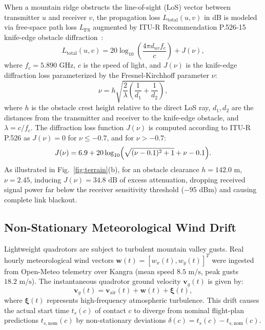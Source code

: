 \documentclass[preprint,12pt,5p,twocolumn]{elsarticle}
\begin{document}
When a mountain ridge obstructs the line-of-sight (LoS) vector between transmitter $u$ and receiver $v$, the propagation loss $L_{\text{total}}(u, v)$ in dB is modeled via free-space path loss $L_{\text{FS}}$ augmented by ITU-R Recommendation P.526-15 knife-edge obstacle diffraction~\cite{itur2019p526}:
\begin{equation}
L_{\text{total}}(u, v) = 20 \log_{10}\left(\frac{4\pi d_{uv} f_c}{c}\right) + J(\nu),
\end{equation}
where $f_c = 5.890\text{ GHz}$, $c$ is the speed of light, and $J(\nu)$ is the knife-edge diffraction loss parameterized by the Fresnel-Kirchhoff parameter $\nu$:
\begin{equation}
\nu = h \sqrt{\frac{2}{\lambda} \left(\frac{1}{d_1} + \frac{1}{d_2}\right)},
\end{equation}
where $h$ is the obstacle crest height relative to the direct LoS ray, $d_1, d_2$ are the distances from the transmitter and receiver to the knife-edge obstacle, and $\lambda = c / f_c$. The diffraction loss function $J(\nu)$ is computed according to ITU-R P.526 as $J(\nu) = 0$ for $\nu \le -0.7$, and for $\nu > -0.7$:
\begin{equation}
J(\nu) = 6.9 + 20\log_{10}\Bigl(\sqrt{(\nu - 0.1)^2 + 1} + \nu - 0.1\Bigr).
\end{equation}
As illustrated in Fig.~\ref{fig:terrain}(b), for an obstacle clearance $h = 142.0\text{ m}$, $\nu = 2.45$, inducing $J(\nu) = 34.8\text{ dB}$ of excess attenuation, dropping received signal power far below the receiver sensitivity threshold ($-95\text{ dBm}$) and causing complete link blackout.

\subsection{Non-Stationary Meteorological Wind Drift}
Lightweight quadrotors are subject to turbulent mountain valley gusts. Real hourly meteorological wind vectors $\mathbf{w}(t) = [w_x(t), w_y(t)]^T$ were ingested from Open-Meteo telemetry over Kangra (mean speed $8.5\text{ m/s}$, peak gusts $18.2\text{ m/s}$). The instantaneous quadrotor ground velocity $\mathbf{v}_g(t)$ is given by:
\begin{equation}
\mathbf{v}_g(t) = \mathbf{v}_{\text{air}}(t) + \mathbf{w}(t) + \boldsymbol{\xi}(t),
\end{equation}
where $\boldsymbol{\xi}(t)$ represents high-frequency atmospheric turbulence. This drift causes the actual start time $t_s(c)$ of contact $c$ to diverge from nominal flight-plan predictions $t_{s,\text{nom}}(c)$ by non-stationary deviations $\delta(c) = t_s(c) - t_{s,\text{nom}}(c)$.
\end{document}
